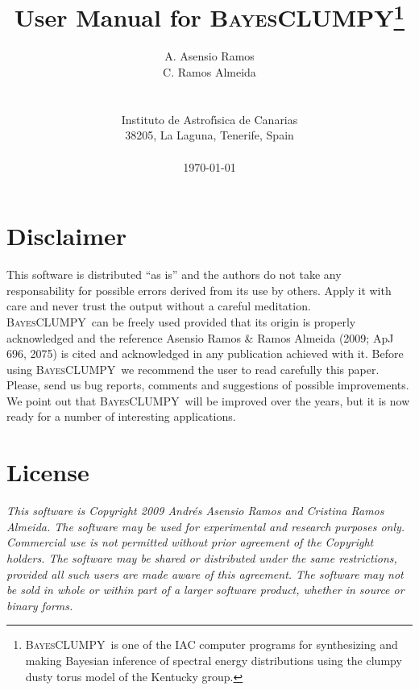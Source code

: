 \documentclass[12pt]{article}
\def\B{\textsc{BayesCLUMPY}}
\begin{document}
\title                  {\sc User Manual for \B\footnote{\B\ is one of the IAC computer
programs for synthesizing and making Bayesian inference of spectral energy distributions using the
clumpy dusty torus model of the Kentucky group.}}

\author{ A. Asensio Ramos \\ C. Ramos Almeida\\\\\\
         Instituto de Astrof\'{\i}sica de Canarias\\
         38205, La Laguna, Tenerife, Spain\\
        \\[0.5in] \today}
\date{}
\maketitle

\newpage

\tableofcontents

\newpage

\section*{Disclaimer}

This software is distributed ``as is'' and the authors do not take any responsability for
possible errors derived from its use by others. Apply it with care and
never trust the output without a careful meditation. \B\ can be freely used
provided that its origin is properly acknowledged and the reference Asensio Ramos \& 
Ramos Almeida (2009; ApJ 696, 2075) is cited and acknowledged in any
publication achieved with it. Before using \B\ we recommend the user to read carefully this
paper. Please, 
send us bug reports, comments and suggestions of possible improvements.
We point out that \B\ will be improved over the years, but it is now ready for a number of
interesting applications.

\section*{License}
\emph{This software is Copyright 2009 Andr\'es Asensio Ramos and Cristina Ramos Almeida. The software
may be used for experimental and research purposes only. Commercial use is
not permitted without prior agreement of the Copyright holders. The
software may be shared or distributed under the same restrictions, provided
all such users are made aware of this agreement. The software may not be
sold in whole or within part of a larger software product, whether in
source or binary forms.}
\end{document}

